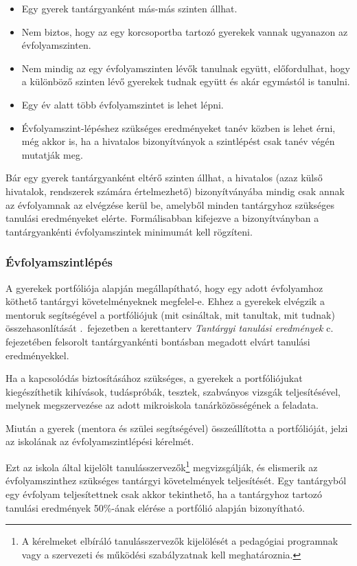 \begin{itemize}
      \item Egy gyerek tantárgyanként más-más szinten állhat.
      \item Nem biztos, hogy az egy korcsoportba tartozó gyerekek vannak ugyanazon az évfolyamszinten.

      \item Nem mindig az egy évfolyamszinten lévők tanulnak együtt, előfordulhat, hogy a különböző szinten lévő gyerekek tudnak együtt és akár egymástól is tanulni.

      \item Egy év alatt több évfolyamszintet is lehet lépni.
      \item Évfolyamszint-lépéshez szükséges eredményeket tanév közben is lehet érni, még akkor is, ha a hivatalos bizonyítványok a szintlépést csak tanév végén mutatják meg.
\end{itemize}

Bár egy gyerek tantárgyanként eltérő szinten állhat, a hivatalos (azaz külső hivatalok, rendszerek számára értelmezhető) bizonyítványába mindig csak annak az évfolyamnak az elvégzése kerül be, amelyből minden tantárgyhoz szükséges tanulási eredményeket elérte. Formálisabban kifejezve a bizonyítványban a tantárgyankénti évfolyamszintek minimumát kell rögzíteni.

\subsubsection{Évfolyamszintlépés}
\label{sec:evfolyamszintlepes}
A gyerekek portfóliója alapján megállapítható, hogy egy adott évfolyamhoz köthető tantárgyi követelményeknek megfelel-e. Ehhez a gyerekek elvégzik a mentoruk segítségével a portfóliójuk (mit csináltak, mit tanultak, mit tudnak) összehasonlítását \ifkerettanterv
      .~fejezetben
\else
      a kerettanterv \emph{Tantárgyi tanulási eredmények} c. fejezetében
\fi felsorolt tantárgyankénti bontásban megadott elvárt tanulási eredményekkel.

Ha a kapcsolódás biztosításához szükséges, a gyerekek a portfóliójukat kiegészíthetik kihívások, tudáspróbák, tesztek, szabványos vizsgák teljesítésével, melynek megszervezése az adott mikroiskola tanárközösségének a feladata.

Miután a gyerek (mentora és szülei segítségével) összeállította a portfólió\-ját, jelzi az iskolának az évfolyamszintlépési kérelmét.

Ezt az iskola által kijelölt tanulásszervezők\footnote{A kérelmeket elbíráló tanulásszervezők kijelölését a pedagógiai programnak vagy a szervezeti és működési szabályzatnak kell meghatároznia.}   megvizsgálják, és elismerik az évfolyamszinthez szükséges tantárgyi követelmények teljesítését. Egy tantárgyból egy évfolyam teljesítettnek csak akkor tekinthető, ha a tantárgyhoz tartozó tanulási eredmények 50\%-ának elérése a portfólió alapján bizonyítható.

